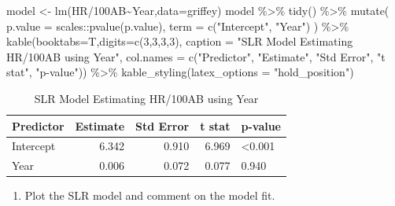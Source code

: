 \documentclass[
  11pt,
]{book}
\newenvironment{Shaded}{\begin{snugshade}}{\end{snugshade}}
\newcommand{\AttributeTok}[1]{\textcolor[rgb]{0.77,0.63,0.00}{#1}}
\newcommand{\DecValTok}[1]{\textcolor[rgb]{0.00,0.00,0.81}{#1}}
\newcommand{\FunctionTok}[1]{\textcolor[rgb]{0.00,0.00,0.00}{#1}}
\newcommand{\NormalTok}[1]{#1}
\newcommand{\OtherTok}[1]{\textcolor[rgb]{0.56,0.35,0.01}{#1}}
\newcommand{\SpecialCharTok}[1]{\textcolor[rgb]{0.00,0.00,0.00}{#1}}
\newcommand{\StringTok}[1]{\textcolor[rgb]{0.31,0.60,0.02}{#1}}
\providecommand{\tightlist}{%
  \setlength{\itemsep}{0pt}\setlength{\parskip}{0pt}}
\theoremstyle{definition}
\theoremstyle{definition}
\theoremstyle{definition}
\theoremstyle{definition}
\theoremstyle{remark}
\begin{document}
\begin{Shaded}
\begin{Highlighting}[]
\NormalTok{model }\OtherTok{\textless{}{-}} \FunctionTok{lm}\NormalTok{(}\StringTok{\textasciigrave{}}\AttributeTok{HR/100AB}\StringTok{\textasciigrave{}}\SpecialCharTok{\textasciitilde{}}\NormalTok{Year,}\AttributeTok{data=}\NormalTok{griffey)}
\NormalTok{model }\SpecialCharTok{\%\textgreater{}\%} \FunctionTok{tidy}\NormalTok{() }\SpecialCharTok{\%\textgreater{}\%}
  \FunctionTok{mutate}\NormalTok{(}
    \AttributeTok{p.value =}\NormalTok{ scales}\SpecialCharTok{::}\FunctionTok{pvalue}\NormalTok{(p.value),}
    \AttributeTok{term =} \FunctionTok{c}\NormalTok{(}\StringTok{"Intercept"}\NormalTok{, }\StringTok{"Year"}\NormalTok{)}
\NormalTok{  ) }\SpecialCharTok{\%\textgreater{}\%}
  \FunctionTok{kable}\NormalTok{(}\AttributeTok{booktabs=}\NormalTok{T,}\AttributeTok{digits=}\FunctionTok{c}\NormalTok{(}\DecValTok{3}\NormalTok{,}\DecValTok{3}\NormalTok{,}\DecValTok{3}\NormalTok{,}\DecValTok{3}\NormalTok{), }
        \AttributeTok{caption =} \StringTok{"SLR Model Estimating HR/100AB using Year"}\NormalTok{,}
        \AttributeTok{col.names =} \FunctionTok{c}\NormalTok{(}\StringTok{"Predictor"}\NormalTok{, }\StringTok{"Estimate"}\NormalTok{, }\StringTok{"Std Error"}\NormalTok{, }\StringTok{"t stat"}\NormalTok{, }\StringTok{"p{-}value"}\NormalTok{)) }\SpecialCharTok{\%\textgreater{}\%}
  \FunctionTok{kable\_styling}\NormalTok{(}\AttributeTok{latex\_options =} \StringTok{"hold\_position"}\NormalTok{)}
\end{Highlighting}
\end{Shaded}

\begin{table}[!h]

\caption{\label{tab:unnamed-chunk-205}SLR Model Estimating HR/100AB using Year}
\centering
\begin{tabular}[t]{lrrrl}
\toprule
Predictor & Estimate & Std Error & t stat & p-value\\
\midrule
Intercept & 6.342 & 0.910 & 6.969 & <0.001\\
Year & 0.006 & 0.072 & 0.077 & 0.940\\
\bottomrule
\end{tabular}
\end{table}

\newpage

\begin{enumerate}
\def\labelenumi{(\alph{enumi})}
\setcounter{enumi}{2}
\tightlist
\item
  Plot the SLR model and comment on the model fit.
\end{enumerate}
\end{document}
